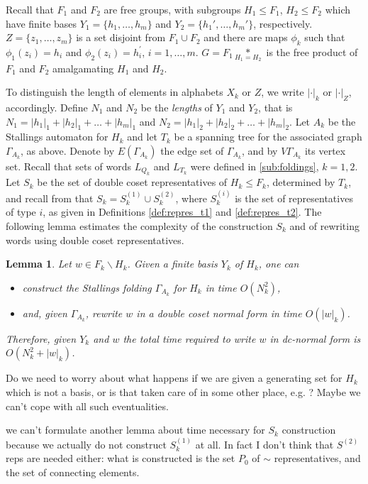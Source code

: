 \documentclass[a4paper,12pt]{article}
\newcommand{\G}{\Gamma }
\newtheorem{lemma}[theorem]{Lemma}
\numberwithin{equation}{section}
\numberwithin{figure}{section}
\begin{document}
Recall that $F_1$ and  $F_2$ are free groups, with subgroups $H_1 \leq
F_1$, $H_2 \leq F_2$ which have finite bases $Y_1 = \{h_1, \ldots, h_m
\}$ and $Y_2=\{h_1', \ldots, h_m'\}$, respectively.  $Z=\{z_1,\ldots ,z_m\}$
is a set disjoint from $F_1\cup F_2$ and there are
maps $\phi_k$ such that $\phi_1(z_i)=h_i$ and
$\phi_2(z_i)=h^\prime_i$, $i=1,\ldots ,m$. 
 $G = F_1 \underset{H_1=H_2}{\ast}$ is the free product of $F_1$ and $F_2$ 
amalgamating $H_1$ and $H_2$. 
 
To distinguish the length of elements in alphabets $X_k$ or
$Z$, we write $|\cdot|_k$ or $|\cdot|_Z$, accordingly. Define  $N_1$ and $N_2$
be the \emph{lengths} of $Y_1$ and $Y_2$, that is 
$N_1 = |h_1|_1 + |h_2|_1 + \ldots + |h_m|_1$ and $N_2 = |h_1|_2 +
|h_2|_2 + \ldots + |h_m|_2$. Let $A_k$ be the Stallings automaton
for $H_k$ and let $T_k$ be a spanning tree for the associated
graph $\G_{A_k}$, as above. Denote by $E(\G_{A_k})$ the  edge set
of $\G_{A_k}$, and by $V\G_{A_k}$  its vertex set. 
Recall that sets of words  $L_{Q_k}$ and $L_{T_k}$
were defined in \ref{sub:foldings}, $k=1,2$. Let $S_k$ be the set of
double coset representatives of $H_k\le F_k$, determined by $T_k$, and 
recall from that $S_k=S_k^{(1)}\cup S_k^{(2)}$, where $S_k^{(i)}$ is the set
of representatives of type $i$, as given in Definitions \ref{def:repres_t1} 
and \ref{def:repres_t2}. 
The following lemma estimates the complexity of the 
construction $S_k$ and of rewriting words using double coset representatives.

\begin{lemma}\label{lem:dctransversal} Let $w \in F_k \smallsetminus H_k$. Given a finite basis $Y_k$ of $H_k$, one can 
\begin{itemize}
\item construct the Stallings folding $\G_{A_k}$ for $H_k$ in time $O(N_k^2)$,
\item and, given $\G_{A_k}$, 
rewrite $w$ in a double coset normal 
form in time  $O(|w|_k)$. 
\end{itemize}
Therefore, given $Y_k$ and $w$ the total time required to write $w$ in dc-normal
 form is  $O(N_k^2 + |w|_k)$.
\end{lemma}

{\ajd Do we need to worry
about what happens if we are given a generating set for $H_k$ which is not a basis,
or is that taken care of in some other place, e.g. \cite{touikan06}? Maybe
we can't cope with all such eventualities.}

{\ef we can't formulate another lemma about time necessary for $S_k$ construction because we actually do not construct $S^{(1)}_k$ at all.}
{\ajd In fact I don't think that $S^{(2)}$ reps are needed either: what is constructed
is the set $P_0$ of $\sim$ representatives, and the set of connecting elements.}
\end{document}
